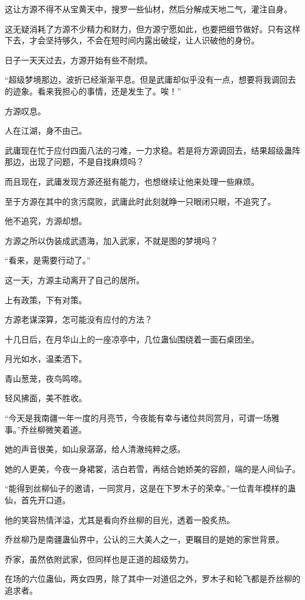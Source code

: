 \begin{this_body}
这让方源不得不从宝黄天中，搜罗一些仙材，然后分解成天地二气，灌注自身。

这无疑消耗了方源不少精力和财力，但方源宁愿如此，也要把细节做好。只有这样下去，才会坚持够久，不会在短时间内露出破绽，让人识破他的身份。

日子一天天过去，方源开始有些不耐烦。

“超级梦境那边，波折已经渐渐平息。但是武庸却似乎没有一点，想要将我调回去的迹象。看来我担心的事情，还是发生了。唉！”

方源叹息。

人在江湖，身不由己。

武庸现在忙于应付四面八法的刁难，一力求稳。若是将方源调回去，结果超级蛊阵那边，出现了问题，不是自找麻烦吗？

而且现在，武庸发现方源还挺有能力，也想继续让他来处理一些麻烦。

至于方源在其中的贪污腐败，武庸此时此刻就睁一只眼闭只眼，不追究了。

他不追究，方源却想。

方源之所以伪装成武遗海，加入武家，不就是图的梦境吗？

“看来，是需要行动了。”

这一天，方源主动离开了自己的居所。

上有政策，下有对策。

方源老谋深算，怎可能没有应付的方法？

十几日后，在月华山上的一座凉亭中，几位蛊仙围绕着一面石桌团坐。

月光如水，温柔洒下。

青山葱茏，夜鸟鸣啼。

轻风拂面，美不胜收。

“今天是我南疆一年一度的月亮节，今夜能有幸与诸位共同赏月，可谓一场雅事。”乔丝柳微笑着道。

她的声音很美，如山泉潺潺，给人清澈纯粹之感。

她的人更美，今夜一身裙裳，洁白若雪，再结合她娇美的容颜，端的是人间仙子。

“能得到丝柳仙子的邀请，一同赏月，这是在下罗木子的荣幸。”一位青年模样的蛊仙，首先开口道。

他的笑容热情洋溢，尤其是看向乔丝柳的目光，透着一股炙热。

乔丝柳乃是南疆蛊仙界中，公认的三大美人之一，更瞩目的是她的家世背景。

乔家，虽然依附武家，但同样也是正道的超级势力。

在场的六位蛊仙，两女四男，除了其中一对道侣之外，罗木子和轮飞都是乔丝柳的追求者。


\end{this_body}
